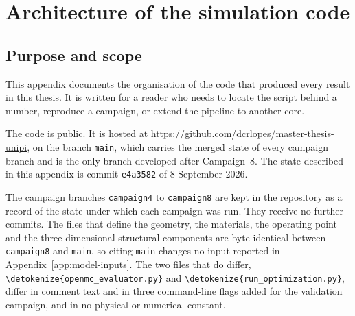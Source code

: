 
\chapter{Architecture of the simulation code}\label{app:code-architecture}

\providecommand{\file}[1]{\expandafter\nolinkurl\expandafter{\detokenize{#1}}}

\providecommand{\openpoint}[1]{\par\noindent\fbox{\parbox{0.97\linewidth}{%
  \small\textbf{Open point.} #1}}\par}

\section{Purpose and scope}\label{sec:arch-scope}

This appendix documents the organisation of the code that produced every
result in this thesis. It is written for a reader who needs to locate the
script behind a number, reproduce a campaign, or extend the pipeline to
another core.

The code is public. It is hosted at
\url{https://github.com/dcrlopes/master-thesis-unipi}, on the branch
\texttt{main}, which carries the merged state of every campaign branch and
is the only branch developed after Campaign~8. The state described in this
appendix is commit \texttt{e4a3582} of 8 September 2026.

The campaign branches \texttt{campaign4} to \texttt{campaign8} are kept in
the repository as a record of the state under which each campaign was run.
They receive no further commits. The files that define the geometry, the
materials, the operating point and the three-dimensional structural components are
byte-identical between \texttt{campaign8} and \texttt{main}, so citing
\texttt{main} changes no input reported in
Appendix~\ref{app:model-inputs}. The two files that do differ,
\file{openmc_evaluator.py} and \file{run_optimization.py}, differ in
comment text and in three command-line flags added for the validation
campaign, and in no physical or numerical constant.


